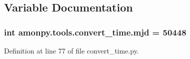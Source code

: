 \subsection{Variable Documentation}
\hypertarget{namespaceamonpy_1_1tools_1_1convert__time_a9e2e26fe437ea66787b4fef91879dc38}{
\subsubsection[{mjd}]{\setlength{\rightskip}{0pt plus 5cm}int amonpy.\-tools.\-convert\-\_\-time.\-mjd = 50448}}\label{namespaceamonpy_1_1tools_1_1convert__time_a9e2e26fe437ea66787b4fef91879dc38}


Definition at line 77 of file convert\-\_\-time.\-py.

